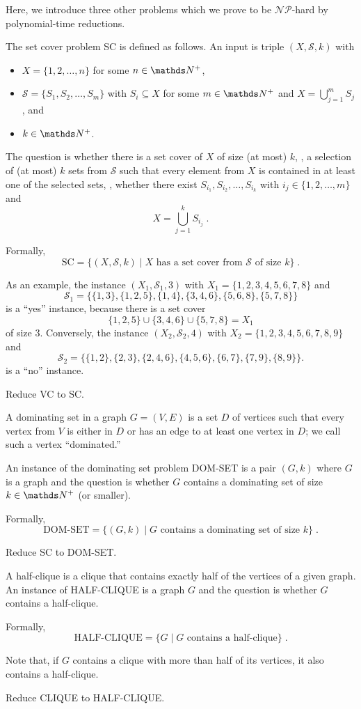 \documentclass{exercise}
\begin{document}
Here, we introduce three other problems which we prove to be
$\mathcal{NP}$-hard by polynomial-time reductions.


\subtask The set cover problem SC is defined as follows.  An input is triple
  $(X,\mathcal{S},k)$ with 
  \begin{itemize}
    \item $X=\{1,2,\dots,n\}$ for some $n\in\nat^+$,
    \item $\mathcal{S}=\{S_1,S_2,\dots,S_m\}$ with $S_i\subseteq X$ for some $m\in\nat^+$ and $X=\bigcup_{j=1}^m S_j$, and
    \item $k\in\nat^+$.
  \end{itemize}
	The question is whether there is a set cover of $X$ of size (at most) $k$,
	\ie, a selection of (at most) $k$ sets from $\mathcal{S}$ such that every
	element from $X$ is contained in at least one of the selected sets, \ie,
	whether there exist $S_{i_1},S_{i_2},\dots,S_{i_k}$ with
	$i_j\in\{1,2,\dots,m\}$ and
  \[ X=\bigcup_{j=1}^k S_{i_j}\;. \]
 
  Formally,
  \[ \text{SC} = \{(X,\mathcal{S},k) \mid X \text{ has a set cover from } \mathcal{S} \text{ of size } k\}\;. \]
  
  As an example, the instance $(X_1,\mathcal{S}_1,3)$ with $X_1=\{1,2,3,4,5,6,7,8\}$ and
  \[ \mathcal{S}_1 = \big\{ \{1,3\}, \{1,2,5\}, \{1,4\}, \{3,4,6\}, \{5,6,8\}, \{5,7,8\} \big\} \]
  is a ``yes'' instance, because there is a set cover
  \[ \{1,2,5\} \cup \{3,4,6\}\cup \{5,7,8\} = X_1 \]
  of size $3$.  Conversely, the instance $(X_2,\mathcal{S}_2,4)$ with $X_2=\{1,2,3,4,5,6,7,8,9\}$
  and
  \[ \mathcal{S}_2 = \big\{\{1,2\}, \{2,3\}, \{2,4,6\}, \{4,5,6\}, \{6,7\}, \{7,9\}, \{8,9\} \big\}. \]
  is a ``no'' instance.

  Reduce VC to SC.
  

\subtask A dominating set in a graph $G=(V,E)$ is a set $D$ of vertices such
  that every vertex from $V$ is either in $D$ or has an edge to at least
  one vertex in $D$; we call such a vertex ``dominated.\!''

  An instance of the dominating set problem DOM-SET is a pair $(G,k)$ where $G$
  is a graph and the question is whether $G$ contains a dominating set of size
  $k\in\nat^+$ (or smaller).

  Formally,
  \[ \text{DOM-SET} = \{(G,k) \mid G \text{ contains a dominating set of size } k\} \;. \]

  Reduce SC to DOM-SET.


\subtask A half-clique is a clique that contains exactly half of
  the vertices of a given graph.  An instance of HALF-CLIQUE is a graph $G$
  and the question is whether $G$ contains a half-clique.
  
  Formally, 
  \[ \text{HALF-CLIQUE} = \{G\mid G \text{ contains a half-clique} \}\;. \]
  
  Note that, if $G$ contains a clique with more than half of its vertices,
  it also contains a half-clique.

  Reduce CLIQUE to HALF-CLIQUE.
  
\end{document}
